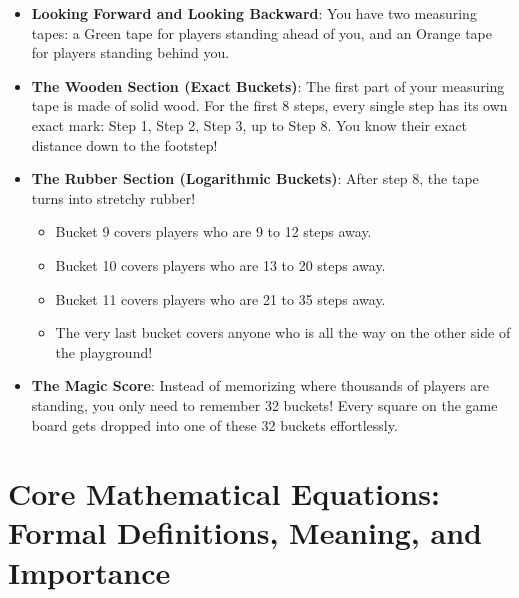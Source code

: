 \documentclass[11pt,a4paper]{article}
\theoremstyle{definition}
\begin{document}
\begin{itemize}
    \item \textbf{Looking Forward and Looking Backward}:
    You have two measuring tapes: a Green tape for players standing ahead of you, and an Orange tape for players standing behind you.
    
    \item \textbf{The Wooden Section (Exact Buckets)}:
    The first part of your measuring tape is made of solid wood. For the first 8 steps, every single step has its own exact mark: Step 1, Step 2, Step 3, up to Step 8. You know their exact distance down to the footstep!
    
    \item \textbf{The Rubber Section (Logarithmic Buckets)}:
    After step 8, the tape turns into stretchy rubber!
    \begin{itemize}
        \item Bucket 9 covers players who are 9 to 12 steps away.
        \item Bucket 10 covers players who are 13 to 20 steps away.
        \item Bucket 11 covers players who are 21 to 35 steps away.
        \item The very last bucket covers anyone who is all the way on the other side of the playground!
    \end{itemize}
    
    \item \textbf{The Magic Score}:
    Instead of memorizing where thousands of players are standing, you only need to remember 32 buckets! Every square on the game board gets dropped into one of these 32 buckets effortlessly.
\end{itemize}

\section{Core Mathematical Equations: Formal Definitions, Meaning, and Importance}
\end{document}
